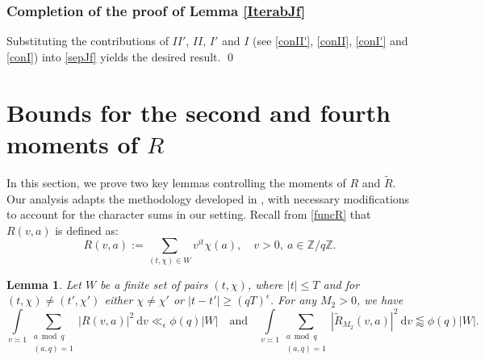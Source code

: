 \documentclass[12pt]{amsart}
\newtheorem{lemma}[theorem]{Lemma}
\theoremstyle{definition}
\theoremstyle{plain}
\theoremstyle{remark}
\numberwithin{equation}{section}
\numberwithin{theorem}{section}
\numberwithin{equation}{section}
\begin{document}
	\subsubsection{Completion of the proof of Lemma \ref{IterabJf}}\label{affTcompl}
	
	Substituting the contributions of $II'$, $II$, $I'$ and $I$ (see \eqref{conII'}, \eqref{conII}, \eqref{conI'} and \eqref{conI}) into \eqref{sepJf} yields the desired result. \qed
	
	\section{\texorpdfstring{Bounds for the second and fourth moments of $R$}
		{Bounds for the second and fourth moments of R}}\label{mobounds}
	In this section, we prove two key lemmas controlling the  moments of  $R$ and $\tilde{R}$. Our analysis adapts the methodology developed in \cite[Section 8]{GM}, with necessary modifications to account for the character sums in our setting. Recall from \eqref{funcR} that $R(v, a)$ is defined as:
	\[
	R(v,a):=\sum_{(t, \chi) \in W}v^{it}\chi(a), \quad v > 0, \ a\in \mathbb{Z}/q\mathbb{Z}.
	\]
	\begin{lemma}\label{secm}
		Let $W$ be a finite set of pairs $(t, \chi)$,  where $|t| \leq T$ and for $(t, \chi)\neq (t', \chi')$ either $\chi \neq \chi'$ or $|t-t'|\geq (qT)^{\epsilon}$. For any $M_{2}>0$, we have
		\[\int\limits_{v \asymp 1}\sum_{\substack{a \bmod q \\ (a,q)=1}}|R(v, a)|^{2}\:\mathrm{d}v \ll_{\epsilon} \phi(q)|W| \quad \mbox{and} \quad \int\limits_{v \asymp 1}\sum_{\substack{a \bmod q \\ (a,q)=1}}|\tilde{R}_{M_{2}}(v, a)|^{2}\:\mathrm{d}v \lessapprox \phi(q)|W|.\]
	\end{lemma}
\end{document}
